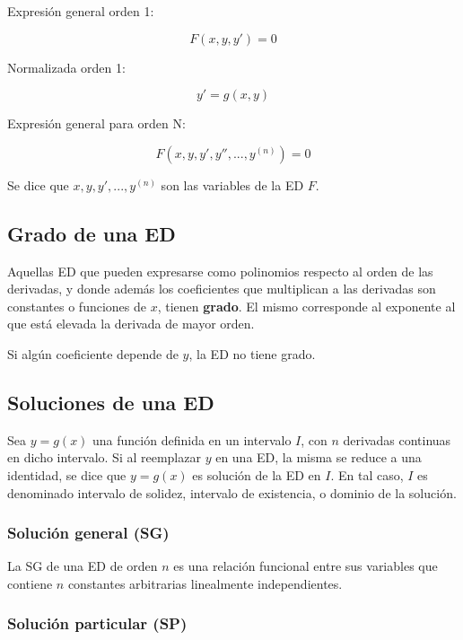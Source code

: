 \documentclass{article}
\begin{document}
Expresión general orden 1:

\begin{equation}
F(x, y, y') = 0
\end{equation}

Normalizada orden 1:

\begin{equation}
y' = g(x, y)
\end{equation}

Expresión general para orden N:

\begin{equation}
F(x, y, y', y'', ..., y^(n)) = 0
\end{equation}

Se dice que $x, y, y', ..., y^(n)$ son las variables de la ED $F$.

\subsection{Grado de una ED}

Aquellas ED que pueden expresarse como polinomios respecto al orden de las derivadas, y donde además los coeficientes que multiplican a las derivadas son constantes o funciones de $x$, tienen \textbf{grado}. El mismo corresponde al exponente al que está elevada la derivada de mayor orden.

Si algún coeficiente depende de $y$, la ED no tiene grado.

\subsection{Soluciones de una ED}

Sea $y = g(x)$ una función definida en un intervalo $I$, con $n$ derivadas continuas en dicho intervalo. Si al reemplazar $y$ en una ED, la misma se reduce a una identidad, se dice que $y = g(x)$ es solución de la ED en $I$. En tal caso, $I$ es denominado intervalo de solidez, intervalo de existencia, o dominio de la solución.

\subsubsection{Solución general (SG)}

La SG de una ED de orden $n$ es una relación funcional entre sus variables 
que contiene $n$ constantes arbitrarias linealmente independientes.

\subsubsection{Solución particular (SP)}
\end{document}
